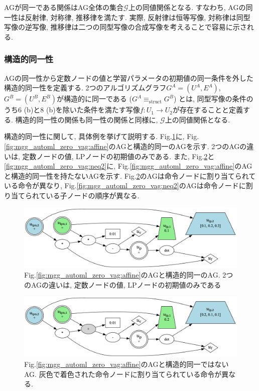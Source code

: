 \documentclass[11pt,oneside,openany,report]{jsbook}
\begin{document}
\noindent
AGが同一である関係はAG全体の集合$\mathcal{G}$上の同値関係となる. すなわち, AGの同一性は反射律, 対称律, 推移律を満たす. 実際, 反射律は恒等写像, 対称律は同型写像の逆写像, 推移律は二つの同型写像の合成写像を考えることで容易に示される.

\subsubsection{構造的同一性}
AGの同一性から定数ノードの値と学習パラメータの初期値の同一条件を外した構造的同一性を定義する. 2つのアルゴリズムグラフ$G^A = (U^A, E^A)$, $G^B = (U^B, E^B)$が構造的に同一である ($G^A \equiv_\mathrm{struct} G^B$) とは, 同型写像の条件のうち6 (b)と8 (b)を除いた条件を満たす写像$ f: U_1 \rightarrow U_2 $が存在することと定義する. 構造的同一性の関係も同一性の関係と同様に, $\mathcal{G}$上の同値関係となる.

構造的同一性に関して, 具体例を挙げて説明する. Fig.\ref{fig:mgg_automl_zero_vag:eq1}に, Fig.\ref{fig:mgg_automl_zero_vag:affine}のAGと構造的同一のAGを示す. 2つのAGの違いは, 定数ノードの値, LPノードの初期値のみである. また, Fig.\ref{fig:mgg_automl_zero_vag:neq1}と\ref{fig:mgg_automl_zero_vag:neq2}に, Fig.\ref{fig:mgg_automl_zero_vag:affine}のAGと構造的同一性を持たないAGを示す. Fig.\ref{fig:mgg_automl_zero_vag:neq1}のAGは命令ノードに割り当てられている命令が異なり, Fig.\ref{fig:mgg_automl_zero_vag:neq2}のAGは命令ノードに割り当てられている子ノードの順序が異なる.

\begin{figure}
  \centering
  \includegraphics[width=14cm]{mgg_automl_zero_vag/ag/eq.png}
  \caption{Fig.\ref{fig:mgg_automl_zero_vag:affine}のAGと構造的同一のAG. 2つのAGの違いは, 定数ノードの値, LPノードの初期値のみである}
  \label{fig:mgg_automl_zero_vag:eq1}
\end{figure}

\begin{figure}
  \centering
  \includegraphics[width=14cm]{mgg_automl_zero_vag/ag/neq1.png}
  \caption{Fig.\ref{fig:mgg_automl_zero_vag:affine}のAGと構造的同一ではないAG. 灰色で着色された命令ノードに割り当てられている命令が異なる.}
  \label{fig:mgg_automl_zero_vag:neq1}
\end{figure}
\end{document}
